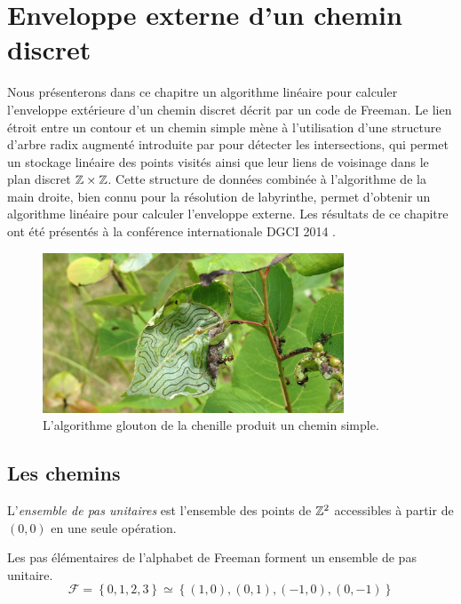 \chapter{Enveloppe externe d'un chemin discret}\label{chapitre-chemins}

Nous présenterons dans ce chapitre un algorithme linéaire pour calculer l'enveloppe extérieure d'un chemin discret décrit par un code de Freeman. Le lien étroit entre un contour et un chemin simple mène à l'utilisation d'une structure d'arbre radix augmenté introduite par \cite{BKP} pour détecter les intersections, qui permet un stockage linéaire des points visités ainsi que leur liens de voisinage dans le plan discret $\mathbb{Z} \times \mathbb{Z}$. Cette structure de données combinée à l'algorithme de la main droite, bien connu pour la résolution de labyrinthe, permet d'obtenir un algorithme linéaire pour calculer l'enveloppe externe. Les résultats de ce chapitre ont été présentés à la conférence internationale DGCI 2014 \cite{BTTW14}.

\begin{figure}[H]
\centering
\includegraphics[width=0.8\textwidth]{fourmi}
\caption{L'algorithme glouton de la chenille produit un chemin simple.}
\end{figure}

\section{Les chemins}\label{chemins:preliminaires}


\begin{definition}
L'\emph{ensemble de pas unitaires} est l'ensemble des points de $\mathbb{Z}^2$ accessibles à partir de $(0,0)$ en une seule opération.
\end{definition}

Les pas élémentaires de l'alphabet de Freeman forment un ensemble de pas unitaire.
$$\mathcal{F}=\left\{0,1,2,3\right\} \simeq \left\{(1,0),(0,1),(−1,0),(0,−1)\right\}$$

